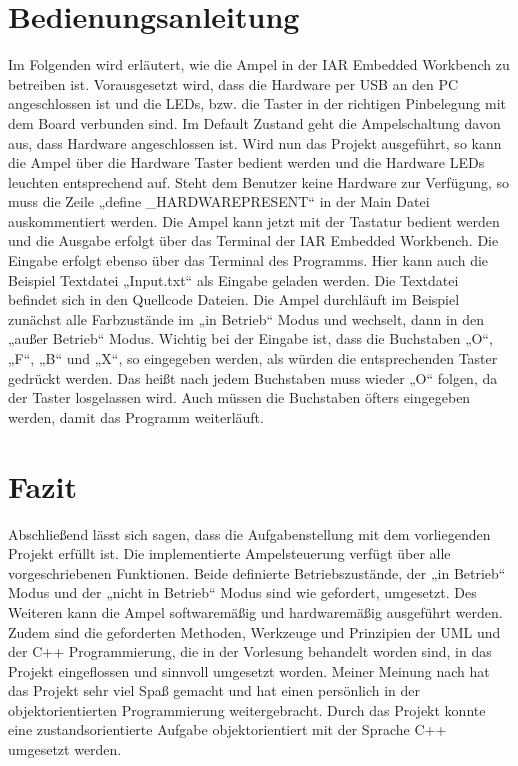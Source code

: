 \chapter{Bedienungsanleitung}
Im Folgenden wird erläutert, wie die Ampel in der IAR Embedded Workbench zu betreiben ist. Vorausgesetzt wird, dass die Hardware per USB an den PC angeschlossen ist und die LEDs, bzw. die Taster in der richtigen Pinbelegung mit dem Board verbunden sind. Im Default Zustand geht die Ampelschaltung davon aus, dass Hardware angeschlossen ist. Wird nun das Projekt ausgeführt, so kann die Ampel über die Hardware Taster bedient werden und die Hardware LEDs leuchten entsprechend auf. Steht dem Benutzer keine Hardware zur Verfügung, so muss die Zeile „define \_HARDWAREPRESENT“ in der Main Datei auskommentiert werden. Die Ampel kann jetzt mit der Tastatur bedient werden und die Ausgabe erfolgt über das Terminal der IAR Embedded Workbench. Die Eingabe erfolgt ebenso über das Terminal des Programms. Hier kann auch die Beispiel Textdatei „Input.txt“ als Eingabe geladen werden. Die Textdatei befindet sich in den Quellcode Dateien. Die Ampel durchläuft im Beispiel zunächst alle Farbzustände im „in Betrieb“ Modus und wechselt, dann in den „außer Betrieb“ Modus. Wichtig bei der Eingabe ist, dass die Buchstaben „O“, „F“, „B“ und „X“, so eingegeben werden, als würden die entsprechenden Taster gedrückt werden. Das heißt nach jedem Buchstaben muss wieder „O“ folgen, da der Taster losgelassen wird. Auch müssen die Buchstaben öfters eingegeben werden, damit das Programm weiterläuft.


\chapter{Fazit}
Abschließend lässt sich sagen, dass die Aufgabenstellung mit dem vorliegenden Projekt erfüllt ist. Die implementierte Ampelsteuerung verfügt über alle vorgeschriebenen Funktionen. Beide definierte Betriebszustände, der „in Betrieb“ Modus und der „nicht in Betrieb“ Modus sind wie gefordert, umgesetzt. Des Weiteren kann die Ampel softwaremäßig und hardwaremäßig ausgeführt werden. Zudem sind die geforderten Methoden, Werkzeuge und Prinzipien der UML und der C++ Programmierung, die in der Vorlesung behandelt worden sind, in das Projekt eingeflossen und sinnvoll umgesetzt worden. Meiner Meinung nach hat das Projekt sehr viel Spaß gemacht und hat einen persönlich in der objektorientierten Programmierung weitergebracht. Durch das Projekt konnte eine zustandsorientierte Aufgabe objektorientiert mit der Sprache C++ umgesetzt werden.

